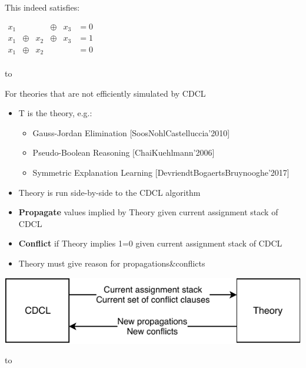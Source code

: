 \documentclass[aspectratio=196]{slides}
\def\TITLE#1{\hbox to \linewidth{\large #1\hfill}}
\def\BOTTOM{\vfill\newpage}
\def\SLIDE#1{\BOTTOM\TITLE{#1}}
\begin{document}
This indeed satisfies:

$\begin{array}{llllll}
x_1 &&&\oplus &x_3 &= 0\\
x_1 &\oplus &x_2 &\oplus &x_3 &= 1\\
x_1 &\oplus &x_2 &&&= 0\\
\end{array}$


\vfill
\newpage
\SLIDE{CDCL(T)}

For theories that are not efficiently simulated by CDCL

\begin{itemize}
\item T is the theory, e.g.:
\begin{itemize}
\item Gauss-Jordan Elimination [SoosNohlCastelluccia'2010]
\item Pseudo-Boolean Reasoning [ChaiKuehlmann'2006]
\item Symmetric Explanation Learning [DevriendtBogaertsBruynooghe'2017]
\end{itemize}
\item Theory is run side-by-side to the CDCL algorithm
\item \textbf{Propagate} values implied by Theory given current assignment stack of CDCL
\item \textbf{Conflict} if Theory implies 1=0 given current assignment stack of CDCL
\item Theory must give reason for propagations\&conflicts
\end{itemize}

\begin{center}
\includegraphics[width=24cm]{CDCL-T}
\end{center}

\vfill
\newpage
\SLIDE{CDCL(T) Cont.}
\end{document}
